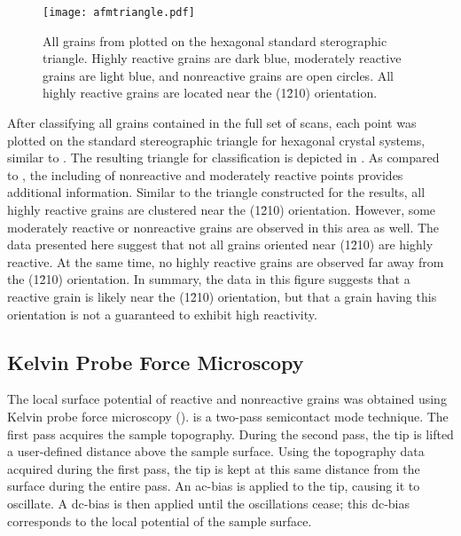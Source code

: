 \begin{figure}
	\centerline{\texttt{[image: afmtriangle.pdf]}}
		\caption[Reactive grains from ]{%
			All grains from  plotted on the 
			hexagonal standard sterographic triangle. Highly reactive grains 
			are dark blue, moderately reactive grains are light blue, and 
			nonreactive grains are open circles. All highly reactive grains 
			are located near the (1\={2}10) orientation.}
	\label{fig:afmtriangle}	
\end{figure}
After classifying all grains contained in the full set of  scans, each point was plotted on the standard stereographic triangle for hexagonal crystal systems, similar to . The resulting triangle for  classification is depicted in . As compared to , the including of nonreactive and moderately reactive points provides additional information. Similar to the triangle constructed for the  results, all highly reactive grains are clustered near the (1\={2}10) orientation. However, some moderately reactive or nonreactive grains are observed in this area as well. The data presented here suggest that not all grains oriented near (1\={2}10) are highly reactive. At the same time, no highly reactive grains are observed far away from the (1\={2}10) orientation. In summary, the data in this figure suggests that a reactive grain is likely near the (1\={2}10) orientation, but that a grain having this orientation is not a guaranteed to exhibit high reactivity. 


\subsection{Kelvin Probe Force Microscopy}
\label{subsec:ch9kfm}


The local surface potential of reactive and nonreactive grains was obtained using Kelvin probe force microscopy ().  is a two-pass semicontact mode technique. The first pass acquires the sample topography. During the second pass, the tip is lifted a user-defined distance above the sample surface. Using the topography data acquired during the first pass, the tip is kept at this same distance from the surface during the entire pass. An ac-bias is applied to the tip, causing it to oscillate. A dc-bias is then applied until the oscillations cease; this dc-bias corresponds to the local potential of the sample surface.

